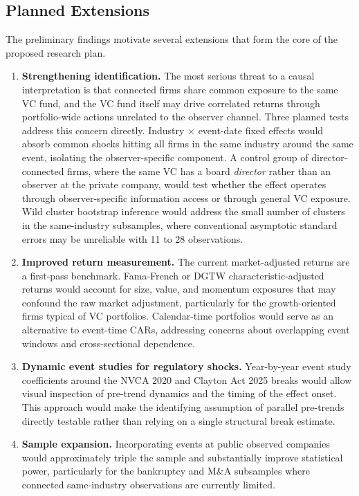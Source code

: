 \subsection{Planned Extensions}

The preliminary findings motivate several extensions that form the core of the proposed research plan.

\begin{enumerate}
\item \textbf{Strengthening identification.} The most serious threat to a causal interpretation is that connected firms share common exposure to the same VC fund, and the VC fund itself may drive correlated returns through portfolio-wide actions unrelated to the observer channel. Three planned tests address this concern directly. Industry $\times$ event-date fixed effects would absorb common shocks hitting all firms in the same industry around the same event, isolating the observer-specific component. A control group of director-connected firms, where the same VC has a board \textit{director} rather than an observer at the private company, would test whether the effect operates through observer-specific information access or through general VC exposure. Wild cluster bootstrap inference would address the small number of clusters in the same-industry subsamples, where conventional asymptotic standard errors may be unreliable with 11 to 28 observations.

\item \textbf{Improved return measurement.} The current market-adjusted returns are a first-pass benchmark. Fama-French or DGTW characteristic-adjusted returns would account for size, value, and momentum exposures that may confound the raw market adjustment, particularly for the growth-oriented firms typical of VC portfolios. Calendar-time portfolios would serve as an alternative to event-time CARs, addressing concerns about overlapping event windows and cross-sectional dependence.

\item \textbf{Dynamic event studies for regulatory shocks.} Year-by-year event study coefficients around the NVCA 2020 and Clayton Act 2025 breaks would allow visual inspection of pre-trend dynamics and the timing of the effect onset. This approach would make the identifying assumption of parallel pre-trends directly testable rather than relying on a single structural break estimate.

\item \textbf{Sample expansion.} Incorporating events at public observed companies would approximately triple the sample and substantially improve statistical power, particularly for the bankruptcy and M\&A subsamples where connected same-industry observations are currently limited.


\end{enumerate}

